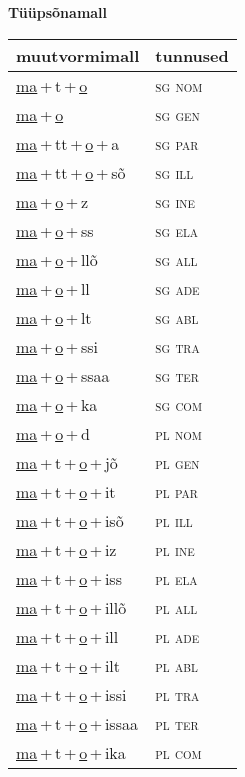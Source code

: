
\vspace{1.8em}
\begin{minipage}{\textwidth}
\textbf{Tüüpsõnamall \,}\\

\begin{sideways}
\begin{tabular}{l l}
muutvormimall & tunnused \\
\hline
\underline{ma}\,+\,t\,+\,\underline{o} & \textsc{ sg nom } \\
\underline{ma}\,+\,\underline{o} & \textsc{ sg gen } \\
\underline{ma}\,+\,tt\,+\,\underline{o}\,+\,a & \textsc{ sg par } \\
\underline{ma}\,+\,tt\,+\,\underline{o}\,+\,sõ & \textsc{ sg ill } \\
\underline{ma}\,+\,\underline{o}\,+\,z & \textsc{ sg ine } \\
\underline{ma}\,+\,\underline{o}\,+\,ss & \textsc{ sg ela } \\
\underline{ma}\,+\,\underline{o}\,+\,llõ & \textsc{ sg all } \\
\underline{ma}\,+\,\underline{o}\,+\,ll & \textsc{ sg ade } \\
\underline{ma}\,+\,\underline{o}\,+\,lt & \textsc{ sg abl } \\
\underline{ma}\,+\,\underline{o}\,+\,ssi & \textsc{ sg tra } \\
\underline{ma}\,+\,\underline{o}\,+\,ssaa & \textsc{ sg ter } \\
\underline{ma}\,+\,\underline{o}\,+\,ka & \textsc{ sg com } \\
\underline{ma}\,+\,\underline{o}\,+\,d & \textsc{ pl nom } \\
\underline{ma}\,+\,t\,+\,\underline{o}\,+\,jõ & \textsc{ pl gen } \\
\underline{ma}\,+\,t\,+\,\underline{o}\,+\,it & \textsc{ pl par } \\
\underline{ma}\,+\,t\,+\,\underline{o}\,+\,isõ & \textsc{ pl ill } \\
\underline{ma}\,+\,t\,+\,\underline{o}\,+\,iz & \textsc{ pl ine } \\
\underline{ma}\,+\,t\,+\,\underline{o}\,+\,iss & \textsc{ pl ela } \\
\underline{ma}\,+\,t\,+\,\underline{o}\,+\,illõ & \textsc{ pl all } \\
\underline{ma}\,+\,t\,+\,\underline{o}\,+\,ill & \textsc{ pl ade } \\
\underline{ma}\,+\,t\,+\,\underline{o}\,+\,ilt & \textsc{ pl abl } \\
\underline{ma}\,+\,t\,+\,\underline{o}\,+\,issi & \textsc{ pl tra } \\
\underline{ma}\,+\,t\,+\,\underline{o}\,+\,issaa & \textsc{ pl ter } \\
\underline{ma}\,+\,t\,+\,\underline{o}\,+\,ika & \textsc{ pl com } \\
\end{tabular}
\end{sideways}
\label{tab:tüüpsõnamall-mato}


\end{minipage}

